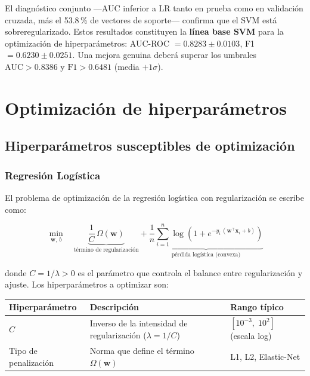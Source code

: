 \documentclass[spanish]{article}
\begin{document}
El diagnóstico conjunto —AUC inferior a LR tanto en prueba como en validación cruzada, más el 53.8\,\% de vectores de soporte— confirma que el SVM está sobreregularizado. Estos resultados constituyen la \textbf{línea base SVM} para la optimización de hiperparámetros: AUC-ROC $= 0.8283 \pm 0.0103$, F1 $= 0.6230 \pm 0.0251$. Una mejora genuina deberá superar los umbrales $\mathrm{AUC} > 0.8386$ y $\mathrm{F1} > 0.6481$ (media $+ 1\sigma$).



\section{Optimización de hiperparámetros}

\subsection{Hiperparámetros susceptibles de optimización}

\subsubsection{Regresión Logística}

El problema de optimización de la regresión logística con regularización se escribe como:

\begin{equation}
\min_{\mathbf{w},\, b} \quad \underbrace{\frac{1}{C}\,\Omega(\mathbf{w})}_{\text{término de regularización}} + \underbrace{\frac{1}{n}\sum_{i=1}^{n} \log\!\left(1 + e^{-y_i\,(\mathbf{w}^\top\mathbf{x}_i + b)}\right)}_{\text{pérdida logística (convexa)}}
\end{equation}

donde $C = 1/\lambda > 0$ es el parámetro que controla el balance entre regularización y ajuste. Los hiperparámetros a optimizar son:

\begin{center}
\begin{tabular}{lll}
\toprule
\textbf{Hiperparámetro} & \textbf{Descripción} & \textbf{Rango típico} \\
\midrule
$C$ & Inverso de la intensidad de regularización ($\lambda = 1/C$) & $[10^{-3},\; 10^{2}]$ (escala log) \\
Tipo de penalización & Norma que define el término $\Omega(\mathbf{w})$ & L1, L2, Elastic-Net \\
\bottomrule
\end{tabular}
\end{center}
\end{document}
